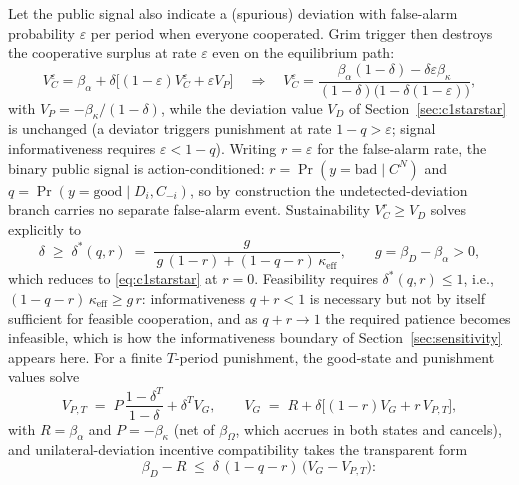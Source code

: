 \documentclass[manuscript,screen,review]{jair}
\begin{document}
Let the public signal also indicate a (spurious) deviation with false-alarm probability $\varepsilon$ per period when everyone cooperated. Grim trigger then destroys the cooperative surplus at rate $\varepsilon$ even on the equilibrium path:
\begin{equation*}
V_C^{\varepsilon} = \beta_\alpha + \delta\bigl[(1-\varepsilon)V_C^{\varepsilon} + \varepsilon V_P\bigr]
\quad\Longrightarrow\quad
V_C^{\varepsilon} = \frac{\beta_\alpha(1-\delta) - \delta\varepsilon\beta_\kappa}{(1-\delta)\bigl(1-\delta(1-\varepsilon)\bigr)},
\end{equation*}
with $V_P = -\beta_\kappa/(1-\delta)$, while the deviation value $V_D$ of Section~\ref{sec:c1starstar} is unchanged (a deviator triggers punishment at rate $1-q > \varepsilon$; signal informativeness requires $\varepsilon < 1-q$). Writing $r = \varepsilon$ for the false-alarm rate, the binary public signal is action-conditioned: $r = \Pr(y = \mathrm{bad} \mid C^N)$ and $q = \Pr(y = \mathrm{good} \mid D_i, C_{-i})$, so by construction the undetected-deviation branch carries no separate false-alarm event. Sustainability $V_C^{r} \geq V_D$ solves explicitly to
\begin{equation*}
\delta \;\geq\; \delta^*(q,r) \;=\; \frac{g}{\,g\,(1-r) + (1-q-r)\,\kappa_{\mathrm{eff}}\,},
\qquad g = \beta_D - \beta_\alpha > 0,
\end{equation*}
which reduces to \eqref{eq:c1starstar} at $r = 0$. Feasibility requires $\delta^*(q,r) \leq 1$, i.e., $(1-q-r)\,\kappa_{\mathrm{eff}} \geq g\,r$: informativeness $q + r < 1$ is necessary but not by itself sufficient for feasible cooperation, and as $q + r \to 1$ the required patience becomes infeasible, which is how the informativeness boundary of Section~\ref{sec:sensitivity} appears here. For a finite $T$-period punishment, the good-state and punishment values solve
\begin{equation*}
V_{P,T} \;=\; P\,\frac{1-\delta^T}{1-\delta} + \delta^T V_G,
\qquad
V_G \;=\; R + \delta\bigl[(1-r)V_G + r\,V_{P,T}\bigr],
\end{equation*}
with $R = \beta_\alpha$ and $P = -\beta_\kappa$ (net of $\beta_\Omega$, which accrues in both states and cancels), and unilateral-deviation incentive compatibility takes the transparent form
\begin{equation*}
\beta_D - R \;\leq\; \delta\,(1-q-r)\,\bigl(V_G - V_{P,T}\bigr):
\end{equation*}
\end{document}
